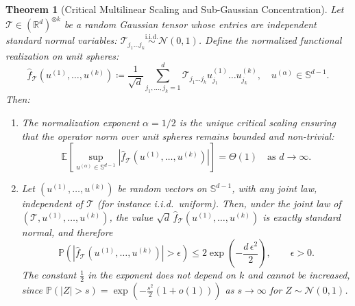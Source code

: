 \documentclass[11pt,a4paper,reqno]{amsart}
\newtheorem{theorem}{Theorem}[section]
\theoremstyle{definition}
\numberwithin{equation}{section}
\providecommand{\R}{\mathbb{R}}
\providecommand{\Sph}{\mathbb{S}}
\begin{document}
\begin{theorem}[Critical Multilinear Scaling and Sub-Gaussian Concentration]
\label{thm:critical_scaling}
Let $\mathcal{T} \in (\R^d)^{\otimes k}$ be a random Gaussian tensor whose entries are independent standard normal variables: $\mathcal{T}_{j_1 \dots j_k} \stackrel{\mathrm{i.i.d.}}{\sim} \mathcal{N}(0, 1)$. Define the normalized functional realization on unit spheres:
\begin{equation}
    \label{eq:renorm_tensor_form}
    \widehat{f}_{\mathcal{T}}(u^{(1)}, \dots, u^{(k)}) \coloneqq \frac{1}{\sqrt{d}} \sum_{j_1, \dots, j_k = 1}^d \mathcal{T}_{j_1 \dots j_k} u_{j_1}^{(1)} \dots u_{j_k}^{(k)}, \quad u^{(\alpha)} \in \Sph^{d-1}.
\end{equation}
Then:
\begin{enumerate}[label=(\roman*)]
    \item The normalization exponent $\alpha = 1/2$ is the unique critical scaling ensuring that the operator norm over unit spheres remains bounded and non-trivial:
    \begin{equation}
        \mathbb{E}\left[ \sup_{u^{(\alpha)} \in \Sph^{d-1}} |\widehat{f}_{\mathcal{T}}(u^{(1)}, \dots, u^{(k)})| \right] = \Theta(1) \quad \text{as } d \to \infty.
    \end{equation}
    \item Let $(u^{(1)}, \dots, u^{(k)})$ be random vectors on $\Sph^{d-1}$, with any joint law, independent of $\mathcal{T}$ (for instance i.i.d.\ uniform). Then, under the joint law of $(\mathcal{T}, u^{(1)}, \dots, u^{(k)})$, the value $\sqrt{d}\,\widehat{f}_{\mathcal{T}}(u^{(1)}, \dots, u^{(k)})$ is exactly standard normal, and therefore
    \begin{equation}
        \label{eq:concentration_inequality}
        \mathbb{P}\left( |\widehat{f}_{\mathcal{T}}(u^{(1)}, \dots, u^{(k)})| > \epsilon \right) \le 2 \exp\left( - \frac{d \, \epsilon^2}{2} \right), \qquad \epsilon > 0.
    \end{equation}
    The constant $\frac12$ in the exponent does not depend on $k$ and cannot be increased, since $\mathbb{P}(|Z| > s) = \exp(-\frac{s^2}{2}(1+o(1)))$ as $s \to \infty$ for $Z \sim \mathcal{N}(0,1)$.
\end{enumerate}
\end{theorem}
\end{document}
